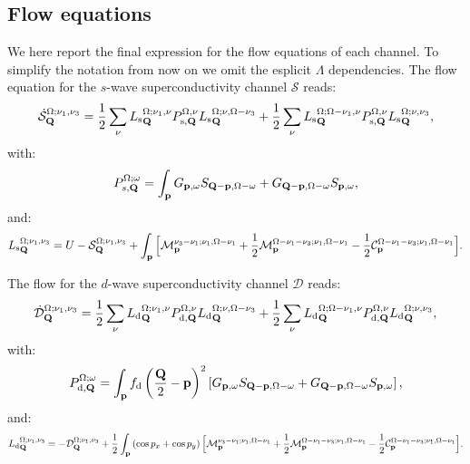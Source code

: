 \subsection{Flow equations}

We here report the final expression for the flow equations of each channel.
To simplify the notation from now on  we omit the esplicit $\Lambda$ dependencies.
The flow equation for the $s$-wave superconductivity channel $\mathcal{S}$ reads:
\begin{equation}
\dot{\mathcal{S}}_{\mathbf{Q}}^{\Omega;\nu_1,\nu_3} = 
  \frac{1}{2} \sum_{\nu}{L_\mathrm{s}}^{\Omega; \nu_1,\nu}_{\mathbf{Q}} P_{\mathrm{s},\mathbf{Q}}^{\Omega,\nu} {L_\mathrm{s}}^{\Omega; \nu,\Omega-\nu_3}_{\mathbf{Q}} 
+ \frac{1}{2} \sum_{\nu}{L_\mathrm{s}}^{\Omega; \Omega-\nu_1,\nu}_{\mathbf{Q}} P_{\mathrm{s},\mathbf{Q}}^{\Omega,\nu} {L_\mathrm{s}}^{\Omega; \nu,\nu_3}_{\mathbf{Q}},
\end{equation} 	   
with: 
\begin{equation}
P_{s,\mathbf{Q}}^{\Omega;\omega} = \int_{\mathbf{p}}  G_{\mathbf{p},\omega}S_{\mathbf{Q}-\mathbf{p},\Omega-\omega} +G_{\mathbf{Q}-\mathbf{p},\Omega-\omega}
S_{\mathbf{p},\omega}, 
\label{eq:app:P_pp}
\end{equation} 
and: 
\begin{align} 
{L_\mathrm{s}}^{\Omega;\nu_1,\nu_3}_{\mathbf{Q}}=U-\mathcal{S}_{\mathbf{Q}}^{\Omega;\nu_1,\nu_3}
+ \int_{\mathbf{p}}  \Big[ \mathcal{M}_{\mathbf{p}}^{\nu_3-\nu_1;\nu_1,\Omega-\nu_1} + \frac{1}{2} \mathcal{M}_{\mathbf{p}}^{\Omega-\nu_1-\nu_3;\nu_1,\Omega-\nu_1} - \frac{1}{2} \mathcal{C}_{\mathbf{p}}^{\Omega-\nu_1-\nu_3;\nu_1,\Omega-\nu_1} \Big]. 
\end{align}	 

The flow for the $d$-wave superconductivity channel  $\mathcal{D}$ reads:
\begin{equation}
\dot{\mathcal{D}}_{\mathbf{Q}}^{\Omega;\nu_1,\nu_3} = 
  \frac{1}{2} \sum_{\nu}{L_\mathrm{d}}^{\Omega; \nu_1,\nu}_{\mathbf{Q}} P_{\mathrm{d},\mathbf{Q}}^{\Omega,\nu} {L_\mathrm{d}}^{\Omega; \nu,\Omega-\nu_3}_{\mathbf{Q}} 
+ \frac{1}{2} \sum_{\nu}{L_\mathrm{d}}^{\Omega; \Omega-\nu_1,\nu}_{\mathbf{Q}} P_{\mathrm{d},\mathbf{Q}}^{\Omega,\nu} {L_\mathrm{d}}^{\Omega; \nu,\nu_3}_{\mathbf{Q}},
\end{equation}
with: 
\begin{equation}
P_{\mathrm{d},\mathbf{Q}}^{\Omega;\omega} = \int_{\mathbf{p}}  f_{\mathrm{d}}\left(\frac{\mathbf{Q}}{2}-\mathbf{p}\right)^2 \left[ G_{\mathbf{p},\omega}S_{\mathbf{Q}-\mathbf{p},\Omega-\omega} +G_{\mathbf{Q}-\mathbf{p},\Omega-\omega}
S_{\mathbf{p},\omega} \right], 
\label{eq:app:P_pp}
\end{equation} 
and: 
\begin{align} 
{L_\mathrm{d}}^{\Omega;\nu_1,\nu_3}_{\mathbf{Q}}=-\mathcal{D}_{\mathbf{Q}}^{\Omega;\nu_1,\nu_3} 
+ \frac{1}{2}\int_{\mathbf{p}} \left(\cos{p_x}+\cos{p_y}\right) \Big[ \mathcal{M}_{\mathbf{p}}^{\nu_3-\nu_1;\nu_1,\Omega-\nu_1} + \frac{1}{2} \mathcal{M}_{\mathbf{p}}^{\Omega-\nu_1-\nu_3;\nu_1,\Omega-\nu_1} - \frac{1}{2} \mathcal{C}_{\mathbf{p}}^{\Omega-\nu_1-\nu_3;\nu_1,\Omega-\nu_1} \Big].
\end{align}	 

